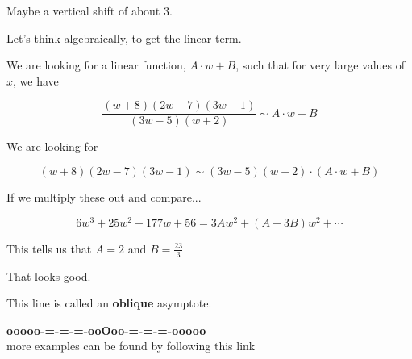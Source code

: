 \documentclass{ximera}
\begin{document}
Maybe a vertical shift of about $3$.



Let's think algebraically, to get the linear term. 


We are looking for a linear function, $A \cdot w + B$, such that for very large values of $x$, we have










\[ \frac{(w+8)(2w-7)(3w-1)}{(3w-5)(w+2)}    \sim    A \cdot w + B  \]




We are looking for 



\[ (w+8)(2w-7)(3w-1)   \sim   (3w-5)(w+2) \cdot  (A \cdot w + B)  \]



If we multiply these out and compare...


\[
6 w^3 + 25 w^2 - 177 w + 56 = 3A w^2 + (A + 3B) w^2 + \cdots
\]


This tells us that $A = 2$ and $B = \frac{23}{3}$




\begin{center}
\end{center}


That looks good.  

This line is called an \textbf{oblique} asymptote.






















\begin{center}
\textbf{\textcolor{green!50!black}{ooooo-=-=-=-ooOoo-=-=-=-ooooo}} \\

more examples can be found by following this link\\ 

\end{center}
\end{document}
